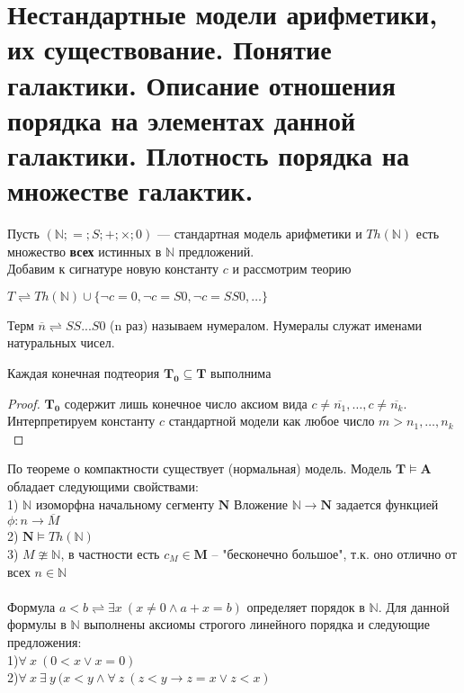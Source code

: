 \section{Нестандартные модели арифметики, их существование. Понятие галактики. Описание отношения порядка на элементах данной галактики. Плотность порядка на множестве галактик.}
\begin{example}
    Пусть $(\mathbb{N};=;S;+;\times;0)$ — стандартная модель арифметики и $ Th(\mathbb{N}) $ есть множество \textbf{всех} истинных в $\mathbb{N}$ предложений.\\
    Добавим к сигнатуре новую константу $c$ и рассмотрим теорию
    \begin{center}
    $T \rightleftharpoons Th(\mathbb{N}) \cup \{\neg c=0,\neg c=S0,\neg c=SS0,\ldots \}$
    \end{center}
    Терм $\overline{n} \rightleftharpoons SS...S0$ (n раз) называем нумералом. Нумералы служат именами натуральных чисел. 
\end{example}
\begin{proposition}
Каждая конечная подтеория $\boldsymbol{T_0}\subseteq \boldsymbol{T}$ выполнима
\end{proposition}
\begin{proof}
$\boldsymbol{T_0}$ содержит лишь конечное число аксиом вида
$c \neq \overline{n_1} ,\ldots, c \neq \overline{n_k}$. Интерпретируем константу $c$ стандартной модели как любое число $m > n_1,\ldots,n_k$
\end{proof}
По теореме о компактности существует (нормальная) модель. Модель $\boldsymbol{T}\models \boldsymbol{A}$ обладает следующими свойствами:\\
1) $\mathbb{N}$ изоморфна начальному сегменту $\boldsymbol{N}$
Вложение $\mathbb{N} \rightarrow \boldsymbol{N}$ задается функцией $\phi: n \longrightarrow \overline{M}$\\
2) $\boldsymbol{N} \models Th(\mathbb{N})$\\
3) $M\ncong \mathbb{N}$, в частности есть  $c_M \in \boldsymbol{M}$ -- "бесконечно большое", т.к. оно отлично от всех $n \in \mathbb{N}$
\\\\
Формула $a<b\rightleftharpoons \exists x\:( x \neq 0 \wedge  a+x=b)$  определяет порядок в $\mathbb{N}$. Для данной
формулы в $\mathbb{N}$ выполнены аксиомы строгого линейного порядка и следующие
предложения:\\
1)$\forall \: x \:(0<x \lor x=0) $\\
2)$\forall \: x \: \exists \: y \: (x<y\wedge \forall \: z\: (z<y\rightarrow z=x \lor z<x)$\\
